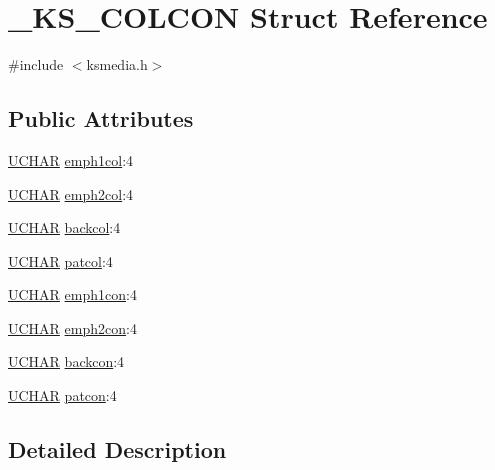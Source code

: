 \hypertarget{struct___k_s___c_o_l_c_o_n}{}\section{\+\_\+\+K\+S\+\_\+\+C\+O\+L\+C\+ON Struct Reference}
\label{struct___k_s___c_o_l_c_o_n}


{\ttfamily \#include $<$ksmedia.\+h$>$}

\subsection*{Public Attributes}
\begin{DoxyCompactItemize}
\item 
\hyperlink{xlisp_8h_a9a1dc6d243c6f75bb42f87e3f69649e4}{U\+C\+H\+AR} \hyperlink{struct___k_s___c_o_l_c_o_n_a216b8b7bae51b64cb4b332bc2a83df32}{emph1col}\+:4
\item 
\hyperlink{xlisp_8h_a9a1dc6d243c6f75bb42f87e3f69649e4}{U\+C\+H\+AR} \hyperlink{struct___k_s___c_o_l_c_o_n_abfd2dd31bd9c6bfba461b6db609db00d}{emph2col}\+:4
\item 
\hyperlink{xlisp_8h_a9a1dc6d243c6f75bb42f87e3f69649e4}{U\+C\+H\+AR} \hyperlink{struct___k_s___c_o_l_c_o_n_a684204cb71734c5d94401f0d223a6846}{backcol}\+:4
\item 
\hyperlink{xlisp_8h_a9a1dc6d243c6f75bb42f87e3f69649e4}{U\+C\+H\+AR} \hyperlink{struct___k_s___c_o_l_c_o_n_a14914e1c5af50855084a0de0e0554a02}{patcol}\+:4
\item 
\hyperlink{xlisp_8h_a9a1dc6d243c6f75bb42f87e3f69649e4}{U\+C\+H\+AR} \hyperlink{struct___k_s___c_o_l_c_o_n_a6a6b7d6acd93353a9de54fdd687a01a9}{emph1con}\+:4
\item 
\hyperlink{xlisp_8h_a9a1dc6d243c6f75bb42f87e3f69649e4}{U\+C\+H\+AR} \hyperlink{struct___k_s___c_o_l_c_o_n_af8ec54add277d731cd81708ff3e1a0e7}{emph2con}\+:4
\item 
\hyperlink{xlisp_8h_a9a1dc6d243c6f75bb42f87e3f69649e4}{U\+C\+H\+AR} \hyperlink{struct___k_s___c_o_l_c_o_n_af0dcdae6fd02ec0d9c9fd3a51cae6b94}{backcon}\+:4
\item 
\hyperlink{xlisp_8h_a9a1dc6d243c6f75bb42f87e3f69649e4}{U\+C\+H\+AR} \hyperlink{struct___k_s___c_o_l_c_o_n_a3447a4044b21fa59ef422a12cb185d47}{patcon}\+:4
\end{DoxyCompactItemize}


\subsection{Detailed Description}


